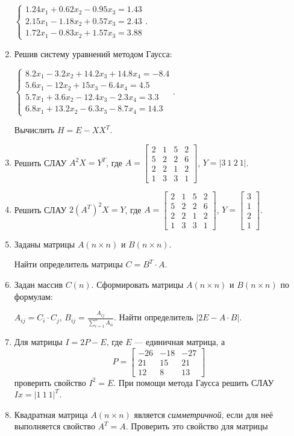 \begin{enumerate}
$\left\{\begin{matrix}1.24x_1+0.62x_2-0.95x_3=1.43\\2.15x_1-1.18x_2+0.57x_3=2.43\\1.72x_1-0.83x_2+1.57x_3=3.88\end{matrix}\right.$.
\item Решив систему уравнений методом Гаусса:

$\left\{\begin{matrix}8.2x_1-3.2x_2+14.2x_3+14.8x_4=-8.4\\5.6x_1-12x_2+15x_3-6.4x_4=4.5\\5.7x_1+3.6x_2-12.4x_3-2.3x_4=3.3\\6.8x_1+13.2x_2-6.3x_3-8.7x_4=14.3\end{matrix}\right.$.

Вычислить  $H=E-XX^T$.
\item Решить СЛАУ $A^2X=Y^T$, где  $A=\left[\begin{matrix}2&1&5&2\\5&2&2&6\\2&2&1&2\\1&3&3&1\end{matrix}\right]$,
 $Y=|3\ 1\ 2\ 1|$.
\item Решить СЛАУ  $2(A^T)^2X=Y$, где 
$A=\left[\begin{matrix}2&1&5&2\\5&2&2&6\\2&2&1&2\\1&3&3&1\end{matrix}\right]$, 
$Y=\left[\begin{matrix}3\\1\\2\\1\end{matrix}\right]$.
\item Заданы матрицы $A(n\times n)$ и $B(n\times n)$. 

Найти определитель матрицы $C=B^T\cdot A$.
\item  Задан массив $C(n)$. Сформировать матрицы $A(n\times n)$ и
$B(n\times n)$ по формулам:

$A_{ij}=C_i\cdot C_j$,  $B_{ij}=\frac{A_{ij}}{\sum\limits_{i=1}^nA_{ii}}$. Найти
определитель  $|2E-A\cdot B|$.
\item Для матрицы  $I=2P-E$, где $E$ --- единичная матрица, а 
\begin{equation*}
P=\left[\begin{matrix}-26&-18&-27\\21&15&21\\12&8&13\end{matrix}\right]
\end{equation*}
проверить свойство  $I^2=E$. При помощи метода Гаусса решить СЛАУ  $Ix=|1\ 1\ 1|^T$.
\item Квадратная матрица $A(n\times n)$ является \emph{симметричной}, если для неё выполняется
свойство  $A^T=A$. Проверить это свойство для матрицы


\end{enumerate}

